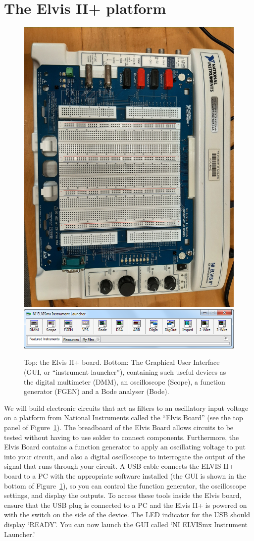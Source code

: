 \documentclass{article}
\begin{document}
\section*{The Elvis II+ platform}
\begin{figure}
  \centering
  \includegraphics[width=0.5\columnwidth]{images/elvisIIplus.jpg}\\
  \includegraphics[width=0.5\columnwidth]{images/launcher.png}
  \caption{Top: the Elvis II+ board. Bottom: The
    Graphical User Interface (GUI, or ``instrument launcher''), containing
    such useful devices as the digital multimeter (DMM), an
    oscilloscope (Scope), a function generator (FGEN) and a Bode
    analyser (Bode).}
  \label{fig:elvisii}
\end{figure}
We will build electronic circuits that act as filters to an
oscillatory input voltage on a platform from National Instruments
called the ``Elvis Board'' (see the top panel of
Figure~\ref{fig:elvisii}). The breadboard of the Elvis Board allows
circuits to be tested without having to use solder to connect
components. Furthermore, the Elvis Board contains a function generator
to apply an oscillating voltage to put into your circuit, and also a
digital oscilloscope to interrogate the output of the signal that runs
through your circuit. A USB cable connects the ELVIS II+ board to a PC
with the appropriate software installed (the GUI is shown in the
bottom of Figure~\ref{fig:elvisii}), so you can control the function
generator, the oscilloscope settings, and display the outputs.  To
access these tools inside the Elvis board, ensure that the USB plug is
connected to a PC and the Elvis II+ is powered on with the switch on
the side of the device. The LED indicator for the USB should display
`READY'. You can now launch the GUI called `NI ELVISmx Instrument
Launcher.'
\end{document}
